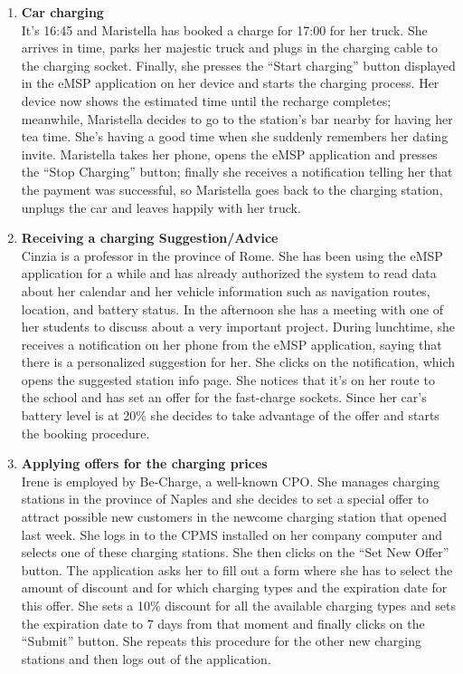 \begin{enumerate}
\item \textbf{Car charging}\\
It’s 16:45 and Maristella has booked a charge for 17:00 for her truck. She arrives in time, parks her majestic truck and plugs in the charging cable to the charging socket. Finally, she presses the “Start charging” button displayed in the eMSP application on her device and starts the charging process. Her device now shows the estimated time until the recharge completes; meanwhile, Maristella decides to go to the station’s bar nearby for having her tea time. 
She’s having a good time when she suddenly remembers her dating invite.
Maristella takes her phone, opens the eMSP application and presses the “Stop Charging” button; finally she receives a notification telling her that the payment was successful, so Maristella goes back to the charging station, unplugs the car and leaves happily with her truck.
\item \textbf{Receiving a charging Suggestion/Advice}\\
Cinzia is a professor in the province of Rome. She has been using the eMSP application for a while and has already authorized the system to read data about her calendar and her vehicle information such as navigation routes, location, and battery status. In the afternoon she has a meeting with one of her students to discuss about a very important project.  During lunchtime, she receives a notification on her phone from the eMSP application, saying that there is a personalized suggestion for her. She clicks on the notification, which opens the suggested station info page. She notices that it's on her route to the school and has set an offer for the fast-charge sockets. Since her car's battery level is at 20\% she decides to take advantage of the offer and starts the booking procedure.
\item \textbf{Applying offers for the charging prices}\\
Irene is employed by Be-Charge, a well-known CPO. She manages charging stations in the province of Naples and she decides to set a special offer to attract possible new customers in the newcome charging station that opened last week.
She logs in to the CPMS installed on her company computer and selects one of these charging stations. She then clicks on the “Set New Offer” button. The application asks her to fill out a form where she has to select the amount of discount and for which charging types and the expiration date for this offer. She sets a 10\% discount for all the available charging types and sets the expiration date to 7 days from that moment and finally clicks on the “Submit” button. She repeats this procedure for the other new charging stations and then logs out of the application.

\end{enumerate}
